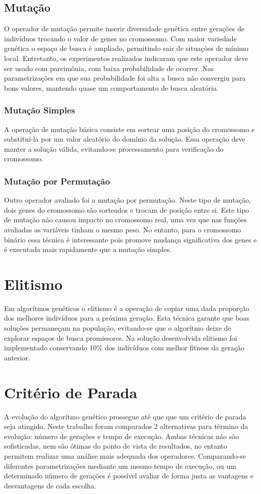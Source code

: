 \documentclass[conference]{IEEEtran}
\begin{document}
\subsection{Mutação}
O operador de mutação permite inserir diversidade genética entre gerações de
indivíduos trocando o valor de genes no cromossomo. Com maior variedade genética
o espaço de busca é ampliado, permitindo sair de situações de mínimo local.
Entretanto, os experimentos realizados indicaram que este operador deve ser
usado com parcimônia, com baixa probabilidade de ocorrer. Nas parametrizações em
que sua probabilidade foi alta a busca não convergiu para bons valores, mantendo
quase um comportamento de busca aleatória.

\subsubsection{Mutação Simples}
A operação de mutação básica consiste em sortear uma posição do cromossomo e
substituí-la por um valor aleatório do domínio da solução. Essa operação deve
manter a solução válida, evitando-se processamento para verificação do
cromossomo.

\subsubsection{Mutação por Permutação}
Outro operador avaliado foi a mutação por permutação. Neste tipo de mutação,
dois genes do cromossomo são sorteados e trocam de posição entre si. Este tipo
de mutação não causou impacto no cromossomo real, uma vez que nas funções
avaliadas as variáveis tinham o mesmo peso. No entanto, para o cromossomo
binário essa técnica é interessante pois promove mudança significativa dos
genes e é executada mais rapidamente que a mutação simples.

\section{Elitismo}
Em algorítmos genéticos o elitismo é a operação de copiar uma dada proporção dos
melhores indivíduos para a próxima geração. Esta técnica garante que boas 
soluções permaneçam na população, evitando-se que o algorítmo deixe de explorar 
espaços de busca promissores.
Na solução desenvolvida elitismo foi implementado conservando 10\% dos
indivíduos com melhor fitness da geração anterior.

\section{Critério de Parada}
A evolução do algorítmo genético prossegue até que que um critério de parada
seja atingido. Neste trabalho foram comparados 2 alternativas para término da
evolução: número de gerações e tempo de execução. Ambas técnicas não são
sofisticadas, nem são ótimas do ponto de vista de resultados, no entanto
permitem realizar uma análise mais adequada dos operadores. Comparando-se
diferentes parametrizações mediante um mesmo tempo de execução, ou um
determinado número de gerações é possível avaliar de forma justa as vantagens e
desvantagens de cada escolha.
\end{document}
